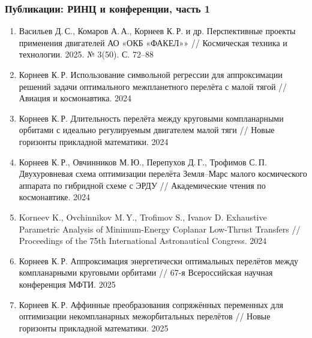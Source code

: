 \begin{frame}
    \frametitle{Публикации: РИНЦ и конференции, часть 1}
    \scriptsize
    \begin{enumerate}
        \item Васильев Д.\,С., Комаров А.\,А., Корнеев К.\,Р. и др. Перспективные проекты применения двигателей АО «ОКБ «ФАКЕЛ»» // Космическая техника и технологии. 2025. № 3(50). С. 72--88
        \item Корнеев К.\,Р. Использование символьной регрессии для аппроксимации решений задачи оптимального межпланетного перелёта с малой тягой // Авиация и космонавтика. 2024
        \item Корнеев К.\,Р. Длительность перелёта между круговыми компланарными орбитами с идеально регулируемым двигателем малой тяги // Новые горизонты прикладной математики. 2024
        \item Корнеев К.\,Р., Овчинников М.\,Ю., Перепухов Д.\,Г., Трофимов С.\,П. Двухуровневая схема оптимизации перелёта Земля--Марс малого космического аппарата по гибридной схеме с ЭРДУ // Академические чтения по космонавтике. 2024
        \item Korneev K., Ovchinnikov M.\,Y., Trofimov S., Ivanov D. Exhaustive Parametric Analysis of Minimum-Energy Coplanar Low-Thrust Transfers // Proceedings of the 75th International Astronautical Congress. 2024
        \item Корнеев К.\,Р. Аппроксимация энергетически оптимальных перелётов между компланарными круговыми орбитами // 67-я Всероссийская научная конференция МФТИ. 2025
        \item Корнеев К.\,Р. Аффинные преобразования сопряжённых переменных для оптимизации некомпланарных межорбитальных перелётов // Новые горизонты прикладной математики. 2025
    \end{enumerate}
\end{frame}
